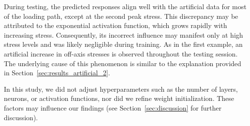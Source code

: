 During testing, the predicted responses align well with the artificial data for most of the loading path, except at the second peak stress. 
This discrepancy may be attributed to the exponential activation function, which grows rapidly with increasing stress. 
Consequently, its incorrect influence may manifest only at high stress levels and was likely negligible during training.
As in the first example, an artificial increase in off-axis stresses is observed throughout the testing session. 
The underlying cause of this phenomenon is similar to the explanation provided in Section~\ref{sec:results_artificial_2}.

In this study, we did not adjust hyperparameters such as the number of layers, neurons, or activation functions, nor did we refine weight initialization. 
These factors may influence our findings (see Section~\ref{sec:discussion} for further discussion).\newline


